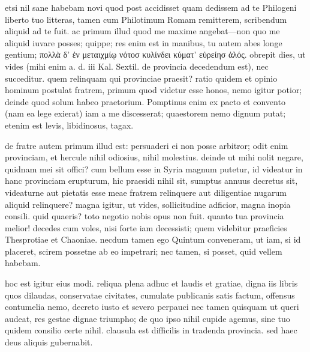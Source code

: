 


 etsi nil sane habebam novi quod post accidisset quam dedissem ad te Philogeni liberto tuo litteras, tamen cum Philotimum Romam remitterem, scribendum aliquid ad te fuit. ac primum illud quod me maxime angebat—non quo me aliquid iuvare posses; quippe; res enim est in manibus, tu autem abes longe gentium; πολλὰ δ' ἐν μεταιχμίῳ νότοσ κυλίνδει κύματ' εὐρείησ ἁλός. obrepit dies, ut vides (mihi enim a. d. iii Kal. Sextil. de provincia decedendum est), nec succeditur. quem relinquam qui provinciae praesit? ratio quidem et opinio hominum postulat fratrem, primum quod videtur esse honos, nemo igitur potior; deinde quod solum habeo praetorium. Pomptinus enim ex pacto et convento (nam ea lege exierat) iam a me discesserat; quaestorem nemo dignum putat; etenim est levis, libidinosus, tagax.

 de fratre autem primum illud est: persuaderi ei non posse arbitror; odit enim provinciam, et hercule nihil odiosius, nihil molestius. deinde ut mihi nolit negare, quidnam mei sit offici? cum bellum esse in Syria magnum putetur, id videatur in hanc provinciam erupturum, hic praesidi nihil sit, sumptus annuus decretus sit, videaturne aut pietatis esse meae fratrem relinquere aut diligentiae nugarum aliquid relinquere? magna igitur, ut vides, sollicitudine adficior, magna inopia consili. quid quaeris? toto negotio nobis opus non fuit. quanto tua provincia melior! decedes cum voles, nisi forte iam decessisti; quem videbitur praeficies Thesprotiae et Chaoniae. necdum tamen ego Quintum conveneram, ut iam, si id placeret, scirem possetne ab eo impetrari; nec tamen, si posset, quid vellem habebam.

 hoc est igitur eius modi. reliqua plena adhuc et laudis et gratiae, digna iis libris quos dilaudas, conservatae civitates, cumulate publicanis satis factum, offensus contumelia nemo, decreto iusto et severo perpauci nec tamen quisquam ut queri audeat, res gestae dignae triumpho; de quo ipso nihil cupide agemus, sine tuo quidem consilio certe nihil. clausula est difficilis in tradenda provincia. sed haec deus aliquis gubernabit.

